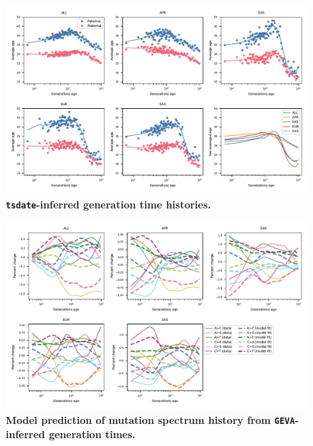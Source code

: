 \documentclass[]{article}
\newcommand{\GEVA}{\texttt{GEVA}\xspace}
\newcommand{\tsdate}{\texttt{tsdate}\xspace}
\begin{document}
\begin{figure}[ht!]
    \centering
    \includegraphics[width=\textwidth]{../plots/inferred_generation_times.DM.tsdate.max_age.10000.pdf}
    \caption{
        \textbf{\tsdate-inferred generation time histories.}
    }
    \label{fig:tsdate-gen-times}
\end{figure}


\begin{figure}[ht!]
    \centering
    \includegraphics[width=\textwidth]{../plots/goodness-of-fit.DM.geva.max_age.10000.pdf}
    \caption{
        \textbf{Model prediction of mutation spectrum history from
        \GEVA-inferred generation times.}
    }
    \label{fig:geva-fit}
\end{figure}
\end{document}
